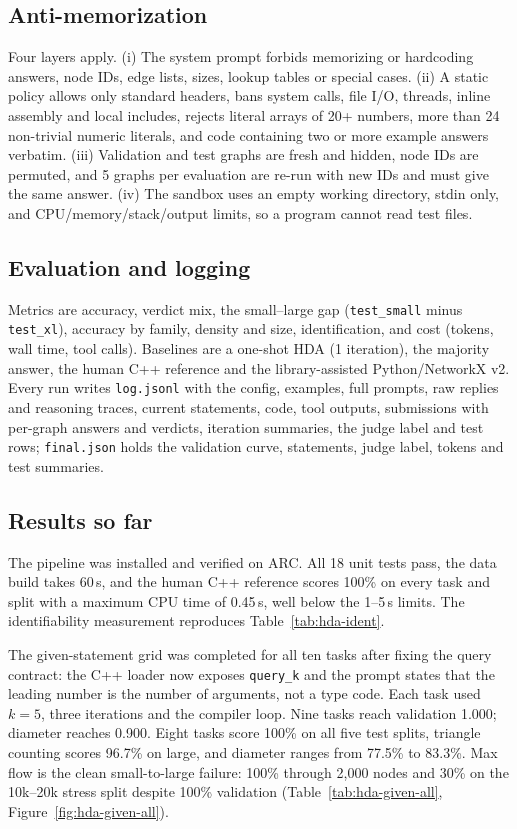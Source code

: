 \documentclass[11pt]{article}
\begin{document}
\subsection{Anti-memorization}
Four layers apply. (i) The system prompt forbids memorizing or hardcoding
answers, node IDs, edge lists, sizes, lookup tables or special cases. (ii) A
static policy allows only standard headers, bans system calls, file I/O, threads,
inline assembly and local includes, rejects literal arrays of 20+ numbers, more
than 24 non-trivial numeric literals, and code containing two or more example
answers verbatim. (iii) Validation and test graphs are fresh and hidden, node
IDs are permuted, and 5 graphs per evaluation are re-run with new IDs and must
give the same answer. (iv) The sandbox uses an empty working directory, stdin
only, and CPU/memory/stack/output limits, so a program cannot read test files.

\subsection{Evaluation and logging}
Metrics are accuracy, verdict mix, the small--large gap
(\texttt{test\_small} minus \texttt{test\_xl}), accuracy by family, density and
size, identification, and cost (tokens, wall time, tool calls). Baselines are a
one-shot HDA (1 iteration), the majority answer, the human C++ reference and the
library-assisted Python/NetworkX v2. Every run writes \texttt{log.jsonl} with
the config, examples, full prompts, raw replies and reasoning traces, current
statements, code, tool outputs, submissions with per-graph answers and
verdicts, iteration summaries, the judge label and test rows;
\texttt{final.json} holds the validation curve, statements, judge label, tokens
and test summaries. 
\subsection{Results so far}
The pipeline was installed and verified on ARC. All 18 unit tests pass, the
data build takes 60\,s, and the human C++ reference scores 100\% on every task
and split with a maximum CPU time of 0.45\,s, well below the 1--5\,s limits.
The identifiability measurement reproduces Table~\ref{tab:hda-ident}.

The given-statement grid was completed for all ten tasks after fixing the
query contract: the C++ loader now exposes \texttt{query\_k} and the prompt
states that the leading number is the number of arguments, not a type code.
Each task used $k=5$, three iterations and the compiler loop. Nine tasks reach
validation 1.000; diameter reaches 0.900. Eight tasks score 100\% on all five
test splits, triangle counting scores 96.7\% on large, and diameter ranges from
77.5\% to 83.3\%. Max flow is the clean small-to-large failure: 100\% through
2{,}000 nodes and 30\% on the 10k--20k stress split despite 100\% validation
(Table~\ref{tab:hda-given-all}, Figure~\ref{fig:hda-given-all}).
\end{document}
